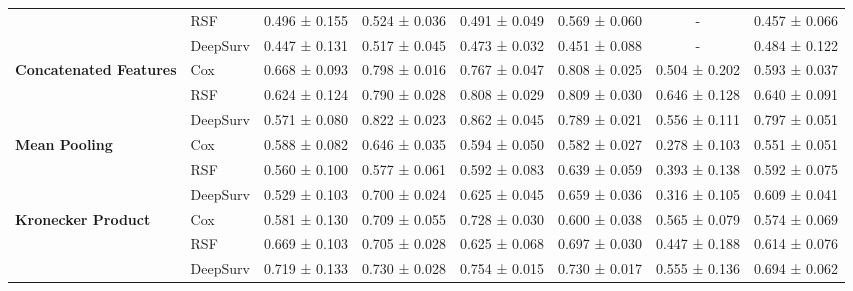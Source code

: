 \begin{sidewaystable}[htbp]
\begin{tabular}{@{}llcccccc@{}}
        & RSF & 0.496 ± 0.155 & 0.524 ± 0.036 & 0.491 ± 0.049 & 0.569 ± 0.060 & - & 0.457 ± 0.066 \\
        & DeepSurv & 0.447 ± 0.131 & 0.517 ± 0.045 & 0.473 ± 0.032 & 0.451 ± 0.088 & - & 0.484 ± 0.122 \\
        \midrule
        \multirow{3}{*}{\textbf{Concatenated Features}} & Cox & 0.668 ± 0.093 & 0.798 ± 0.016 & 0.767 ± 0.047 & 0.808 ± 0.025 & 0.504 ± 0.202 & 0.593 ± 0.037 \\
        & RSF & 0.624 ± 0.124 & 0.790 ± 0.028 & 0.808 ± 0.029 & 0.809 ± 0.030 & 0.646 ± 0.128 & 0.640 ± 0.091 \\
        & DeepSurv & 0.571 ± 0.080 & 0.822 ± 0.023 & 0.862 ± 0.045 & 0.789 ± 0.021 & 0.556 ± 0.111 & 0.797 ± 0.051 \\
        \midrule
        \multirow{3}{*}{\textbf{Mean Pooling}} & Cox & 0.588 ± 0.082 & 0.646 ± 0.035 & 0.594 ± 0.050 & 0.582 ± 0.027 & 0.278 ± 0.103 & 0.551 ± 0.051 \\
        & RSF & 0.560 ± 0.100 & 0.577 ± 0.061 & 0.592 ± 0.083 & 0.639 ± 0.059 & 0.393 ± 0.138 & 0.592 ± 0.075 \\
        & DeepSurv & 0.529 ± 0.103 & 0.700 ± 0.024 & 0.625 ± 0.045 & 0.659 ± 0.036 & 0.316 ± 0.105 & 0.609 ± 0.041 \\
        \midrule
        \multirow{3}{*}{\textbf{Kronecker Product}} & Cox & 0.581 ± 0.130 & 0.709 ± 0.055 & 0.728 ± 0.030 & 0.600 ± 0.038 & 0.565 ± 0.079 & 0.574 ± 0.069 \\
        & RSF & 0.669 ± 0.103 & 0.705 ± 0.028 & 0.625 ± 0.068 & 0.697 ± 0.030 & 0.447 ± 0.188 & 0.614 ± 0.076 \\
        & DeepSurv & 0.719 ± 0.133 & 0.730 ± 0.028 & 0.754 ± 0.015 & 0.730 ± 0.017 & 0.555 ± 0.136 & 0.694 ± 0.062 \\
        \bottomrule
    \end{tabular}
\end{sidewaystable}

